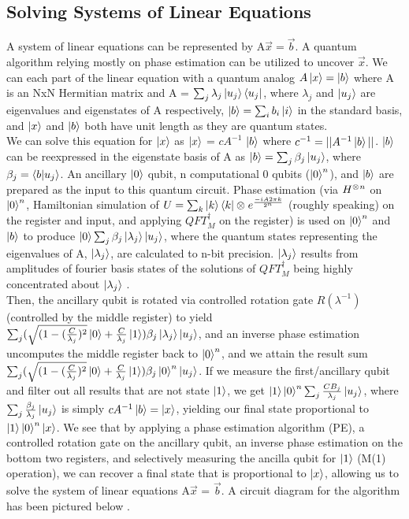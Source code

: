 \documentclass[11pt]{journal}
\newcommand{\tens}[1]{%
  \mathbin{\mathop{\otimes}\displaylimits_{#1}}%
}
\begin{document}
\subsection{Solving Systems of Linear Equations}
\indent A system of linear equations can be represented by A$\vec{x} = \vec{b}$. A quantum algorithm relying mostly on phase estimation can be utilized to uncover $\vec{x}$. We can each part of the linear equation with a quantum analog $A\ket{x} = \ket{b}$ where A is an NxN Hermitian matrix and A = $\sum_j \lambda_j \ket{u_j}\bra{u_j}$, where $\lambda_j$ and $\ket{u_j}$ are eigenvalues and eigenstates of A respectively, $\ket{b} = \sum_i b_i \ket{i}$ in the standard basis, and $\ket{x}$ and $\ket{b}$ both have unit length as they are quantum states\cite{sle2}. 
\\\indent We can solve this equation for $\ket{x}$ as $\ket{x}$ = $c A^{-1}$ $\ket{b}$ where $c^{-1} = || A^{-1} \ket{b} ||$. $\ket{b}$ can be reexpressed in the eigenstate basis of A as $\ket{b} = \sum_j \beta_j \ket{u_j}$, where $\beta_j = \bra{b}\ket{u_j}$. An ancillary $\ket{0}$ qubit, n computational 0 qubits ($\ket{0}^n$), and $\ket{b}$ are prepared as the input to this quantum circuit. Phase estimation (via $H^{\tens{}n}$ on $\ket{0}^n$, Hamiltonian simulation of $U = \sum_k \ket{k}\bra{k}\tens{}e^{\frac{-iA2\pi k}{2^n}}$ (roughly speaking) on the register and input, and applying $QFT_M^\dagger$ on the register) is used on $\ket{0}^n$ and $\ket{b}$ to produce $\ket{0} \sum_j \beta_j \ket{\lambda_j} \ket{u_j}$, where the quantum states representing the eigenvalues of A, $\ket{\lambda_j}$, are calculated to n-bit precision. $\ket{\lambda_j}$ results from amplitudes of fourier basis states of the solutions of $QFT_M^\dagger$ being highly concentrated about $\ket{\lambda_j}$ \cite{sle1}.
\\\indent Then, the ancillary qubit is rotated via controlled rotation gate $R(\lambda^{-1})$ (controlled by the middle register) to yield $\sum_j (\sqrt{(1-(\frac{C}{\lambda_j})^2}\ket{0} + \frac{C}{\lambda_j} \ket{1}) \beta_j \ket{\lambda_j} \ket{u_j}$, and an inverse phase estimation uncomputes the middle register back to $\ket{0}^n$, and we attain the result sum $\sum_j (\sqrt{(1-(\frac{C}{\lambda_j})^2}\ket{0} + \frac{C}{\lambda_j} \ket{1}) \beta_j \ket{0}^n \ket{u_j}$. If we measure the first/ancillary qubit and filter out all results that are not state $\ket{1}$, we get $\ket{1}\ket{0}^n\sum_j \frac{CB_j}{\lambda_j}\ket{u_j}$, where $\sum_j\frac{\beta_j}{\lambda_j}\ket{u_j}$ is simply $cA^{-1}\ket{b} = \ket{x}$, yielding our final state proportional to $\ket{1}\ket{0}^n\ket{x}$. We see that by applying a phase estimation algorithm (PE), a controlled rotation gate on the ancillary qubit, an inverse phase estimation on the bottom two registers, and selectively measuring the ancilla qubit for $\ket{1}$ (M(1) operation), we can recover a final state that is proportional to $\ket{x}$, allowing us to solve the system of linear equations A$\vec{x}$ = $\vec{b}$. A circuit diagram for the algorithm has been pictured below \cite{sle2}. 
\end{document}
